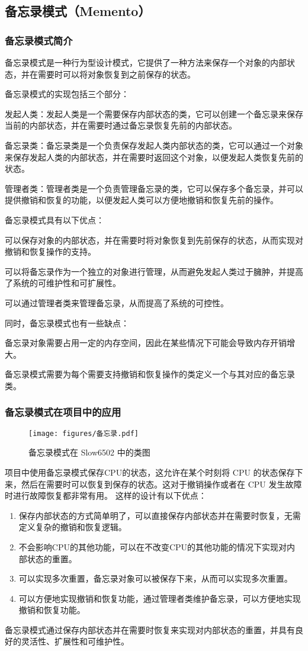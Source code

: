 \subsection{备忘录模式（Memento）}

\subsubsection{备忘录模式简介}

备忘录模式是一种行为型设计模式，它提供了一种方法来保存一个对象的内部状态，并在需要时可以将对象恢复到之前保存的状态。

备忘录模式的实现包括三个部分：

发起人类：发起人类是一个需要保存内部状态的类，它可以创建一个备忘录来保存当前的内部状态，并在需要时通过备忘录恢复先前的内部状态。

备忘录类：备忘录类是一个负责保存发起人类内部状态的类，它可以通过一个对象来保存发起人类的内部状态，并在需要时返回这个对象，以便发起人类恢复先前的状态。

管理者类：管理者类是一个负责管理备忘录的类，它可以保存多个备忘录，并可以提供撤销和恢复的功能，以便发起人类可以方便地撤销和恢复先前的操作。

备忘录模式具有以下优点：

可以保存对象的内部状态，并在需要时将对象恢复到先前保存的状态，从而实现对撤销和恢复操作的支持。

可以将备忘录作为一个独立的对象进行管理，从而避免发起人类过于臃肿，并提高了系统的可维护性和可扩展性。

可以通过管理者类来管理备忘录，从而提高了系统的可控性。

同时，备忘录模式也有一些缺点：

备忘录对象需要占用一定的内存空间，因此在某些情况下可能会导致内存开销增大。

备忘录模式需要为每个需要支持撤销和恢复操作的类定义一个与其对应的备忘录类。

\subsubsection{备忘录模式在项目中的应用}

\begin{figure}[H]
  \centering
  \texttt{[image: figures/备忘录.pdf]}
  \caption{备忘录模式在 Slow6502 中的类图}
\end{figure}

项目中使用备忘录模式保存CPU的状态，这允许在某个时刻将 CPU 的状态保存下来，然后在需要时可以恢复到保存的状态。这对于撤销操作或者在 CPU 发生故障时进行故障恢复都非常有用。
这样的设计有以下优点：

\begin{enumerate}
  \item 保存内部状态的方式简单明了，可以直接保存内部状态并在需要时恢复，无需定义复杂的撤销和恢复逻辑。
  \item 不会影响CPU的其他功能，可以在不改变CPU的其他功能的情况下实现对内部状态的重置。
  \item 可以实现多次重置，备忘录对象可以被保存下来，从而可以实现多次重置。
  \item 可以方便地实现撤销和恢复功能，通过管理者类维护备忘录，可以方便地实现撤销和恢复功能。
\end{enumerate}
备忘录模式通过保存内部状态并在需要时恢复来实现对内部状态的重置，并具有良好的灵活性、扩展性和可维护性。
